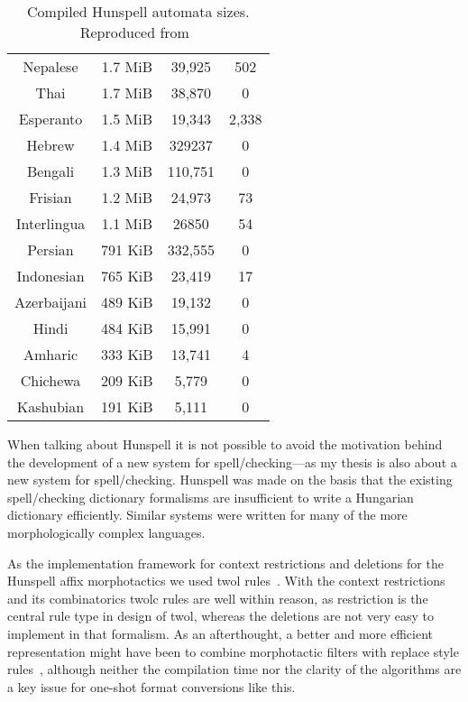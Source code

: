 \documentclass[officiallayout]{unihelcompling}
\begin{document}
\begin{table}
\begin{tabular}{c|c|c|c}
    Nepalese & 1.7 MiB & 39,925 & 502 \\
    Thai & 1.7 MiB & 38,870 & 0 \\
    Esperanto & 1.5 MiB & 19,343 & 2,338 \\
    Hebrew & 1.4 MiB & 329237 & 0 \\
    Bengali & 1.3 MiB & 110,751 & 0 \\
    Frisian& 1.2 MiB & 24,973 & 73 \\
    Interlingua & 1.1 MiB & 26850 & 54 \\
    Persian & 791 KiB & 332,555 & 0 \\
    Indonesian & 765 KiB & 23,419 & 17 \\
    Azerbaijani & 489 KiB & 19,132 & 0 \\
    Hindi & 484 KiB & 15,991 & 0 \\
    Amharic & 333 KiB & 13,741 & 4 \\
    Chichewa & 209 KiB & 5,779 & 0 \\
    Kashubian & 191 KiB & 5,111 & 0 \\
    \hline
  \end{tabular}

  \caption{Compiled Hunspell automata sizes. Reproduced 
      from~
  \label{table:cla-2010-repro}}
\end{table}



When talking about Hunspell it is not possible to avoid the motivation behind
the development of a new system for spell\-/checking---as my thesis is also
about a new system for spell\-/checking. Hunspell was made on the basis that
the existing spell\-/checking dictionary formalisms are insufficient to write a
Hungarian dictionary efficiently. Similar systems were written for many of the
more morphologically complex languages. 


As the implementation framework for context restrictions and deletions for the
Hunspell affix morphotactics we used twol rules~\citep{karttunen1992two}. With
the context restrictions and its combinatorics twolc rules are well within
reason, as restriction is the central rule type in design of twol, whereas the
deletions are not very easy to implement in that formalism. As an afterthought,
a better and more efficient representation might have been to combine
morphotactic filters with replace style rules~\citep{karttunen1995replace},
although neither the compilation time nor the clarity of the algorithms are a
key issue for one-shot format conversions like this.
\end{document}
